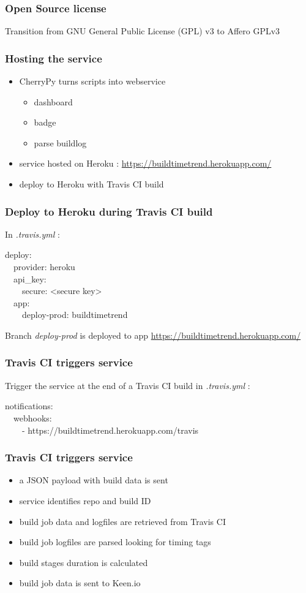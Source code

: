 \documentclass[14pt]{beamer}
\begin{document}
  \begin{frame}
    \frametitle{Open Source license}
    Transition from GNU General Public License (GPL) v3 to Affero GPLv3
  \end{frame}
  \begin{frame}
    \frametitle{Hosting the service}
    \begin{itemize}
      \item CherryPy turns scripts into webservice
        \begin{itemize}
          \item dashboard
          \item badge
          \item parse buildlog
        \end{itemize}
      \item service hosted on Heroku : \href{https://buildtimetrend.herokuapp.com/}{https://buildtimetrend.herokuapp.com/}
      \item deploy to Heroku with Travis CI build
    \end{itemize}
  \end{frame}
  \begin{frame}
    \frametitle{Deploy to Heroku during Travis CI build}
    In \textit{.travis.yml} :
    \begin{example}
      \small{deploy:\\
      \ \ provider: heroku\\
      \ \ api\_key:\\
      \ \ \ \ secure: <secure key>\\
      \ \ app:\\
      \ \ \ \ deploy-prod: buildtimetrend}
    \end{example}
    Branch \textit{deploy-prod} is deployed to app \href{https://buildtimetrend.herokuapp.com/}{https://buildtimetrend.herokuapp.com/}
  \end{frame}
  \begin{frame}
    \frametitle{Travis CI triggers service}
    Trigger the service at the end of a Travis CI build in \textit{.travis.yml} :
    \begin{example}
      \small{notifications:\\
      \ \ webhooks:\\
      \ \ \ \ - https://buildtimetrend.herokuapp.com/travis}
    \end{example}
  \end{frame}
  \begin{frame}
    \frametitle{Travis CI triggers service}
    \begin{itemize}
      \item a JSON payload with build data is sent
      \item service identifies repo and build ID
      \item build job data and logfiles are retrieved from Travis CI
      \item build job logfiles are parsed looking for timing tags
      \item build stages duration is calculated
      \item build job data is sent to Keen.io
    \end{itemize}
  \end{frame}
\end{document}
